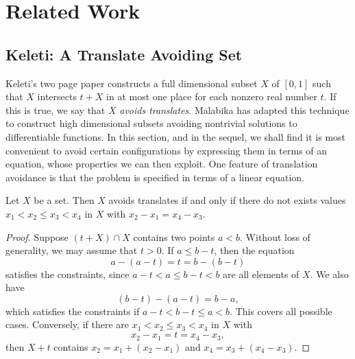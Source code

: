 
\chapter{Related Work}
\label{ch:RelatedWork}

\section{Keleti: A Translate Avoiding Set}

Keleti's two page paper constructs a full dimensional subset $X$ of $[0,1]$ such that $X$ intersects $t + X$ in at most one place for each nonzero real number $t$. If this is true, we say that $X$ \emph{avoids translates}. Malabika has adapted this technique to construct high dimensional subsets avoiding nontrivial solutions to differentiable functions. In this section, and in the sequel, we shall find it is most convenient to avoid certain configurations by expressing them in terms of an equation, whose properties we can then exploit. One feature of translation avoidance is that the problem is specified in terms of a linear equation.

\begin{lemma}
    Let $X$ be a set. Then $X$ avoids translates if and only if there do not exists values $x_1 < x_2 \leq x_3 < x_4$ in $X$ with $x_2 - x_1 = x_4 - x_3$.
\end{lemma}
\begin{proof}

    Suppose $(t + X) \cap X$ contains two points $a < b$. Without loss of generality, we may assume that $t > 0$. If $a \leq b - t$, then the equation
    \[ a - (a - t) = t = b - (b - t) \]
    satisfies the constraints, since $a - t < a \leq b - t < b$ are all elements of $X$. We also have
    \[ (b - t) - (a - t) = b - a, \]
    which satisfies the constraints if $a - t < b - t \leq a < b$. This covers all possible cases. Conversely, if there are $x_1 < x_2 \leq x_3 < x_4$ in $X$ with
    \[ x_2 - x_1 = t = x_4 - x_3, \]
    then $X + t$ contains $x_2 = x_1 + (x_2 - x_1)$ and $x_4 = x_3 + (x_4 - x_3)$.
\end{proof}


